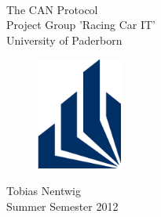 \begin{titlepage}
   \mbox{}\vspace{4\baselineskip}\\
   \sffamily\huge
   \centering
   The CAN Protocol
   \vspace{3\baselineskip}\\
   \rmfamily\Large
   Project Group 'Racing Car IT'
   \vspace{1\baselineskip}\\
   \rmfamily\Large
   University of Paderborn
   \vspace{1\baselineskip}\\
   \begin{figure}[htb]
    \centering
	\includegraphics[width=0.25\textwidth]{content/pictures/university_pb.png}
	\end{figure}
   \vspace{4\baselineskip}
   \rmfamily\Large
   Tobias Nentwig
   \vspace{2\baselineskip}\\
   \rmfamily\Large
   Summer Semester 2012
\end{titlepage}